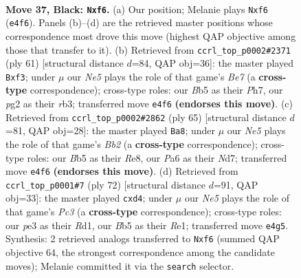 \documentclass[11pt]{article}
\begin{document}
\clearpage

\begin{figure}[p]\centering
\begin{subfigure}{0.46\textwidth}\centering
\resizebox{\linewidth}{!}{%
\newchessgame
\chessboard[
  setfen={r3r3/1kP5/p4B2/1b1N1p2/4n2R/1B2P3/1P4P1/R2KN3 b - - 0 37},
  showmover=false,
  pgfstyle=straightmove, color=movearrow, markmove={e4-f6}
]}
\caption{}
\end{subfigure}\hfill
\begin{subfigure}{0.46\textwidth}\centering
\resizebox{\linewidth}{!}{%
\newchessgame
\chessboard[
  setfen={2r2rk1/6pp/8/p4nR1/P7/1R2BN1P/4bPP1/6K1 b - - 0 31},
  showmover=false,
  pgfstyle=straightmove, color=movearrow, markmove={e2-f3}
]}
\caption{}
\end{subfigure}
\\[4pt]
\begin{subfigure}{0.46\textwidth}\centering
\resizebox{\linewidth}{!}{%
\newchessgame
\chessboard[
  setfen={3rr3/1b1n1pk1/p5p1/6P1/1R6/1NN1bP2/1PP1B3/1K1R4 b - - 2 33},
  showmover=false,
  pgfstyle=straightmove, color=movearrow, markmove={b7-a8}
]}
\caption{}
\end{subfigure}\hfill
\begin{subfigure}{0.46\textwidth}\centering
\resizebox{\linewidth}{!}{%
\newchessgame
\chessboard[
  setfen={4r1k1/3r1p2/1n4b1/8/2pbPBp1/P1P5/1P1N2K1/3RR3 w - - 0 37},
  showmover=false,
  pgfstyle=straightmove, color=movearrow, markmove={c3-d4}
]}
\caption{}
\end{subfigure}
\caption{\textbf{Move 37, Black: \texttt{Nxf6}.} (a) Our position; Melanie plays \texttt{Nxf6} (\texttt{e4f6}). Panels (b)--(d) are the retrieved master positions whose correspondence most drove this move (highest QAP objective among those that transfer to it). (b) Retrieved from \texttt{ccrl\_top\_p0002\#2371} (ply 61) [structural distance $d$=84, QAP obj=36]: the master played \texttt{Bxf3}; under $\mu$ our \emph{Ne5} plays the role of that game's \emph{Be7} (a \textbf{cross-type} correspondence); cross-type roles: our \emph{B}b5 as their \emph{P}h7, our \emph{p}g2 as their \emph{r}b3; transferred move \texttt{e4f6} \textbf{(endorses this move)}. (c) Retrieved from \texttt{ccrl\_top\_p0002\#2862} (ply 65) [structural distance $d$=81, QAP obj=28]: the master played \texttt{Ba8}; under $\mu$ our \emph{Ne5} plays the role of that game's \emph{Bb2} (a \textbf{cross-type} correspondence); cross-type roles: our \emph{B}b5 as their \emph{R}e8, our \emph{P}a6 as their \emph{N}d7; transferred move \texttt{e4f6} \textbf{(endorses this move)}. (d) Retrieved from \texttt{ccrl\_top\_p0001\#7} (ply 72) [structural distance $d$=91, QAP obj=33]: the master played \texttt{cxd4}; under $\mu$ our \emph{Ne5} plays the role of that game's \emph{Pc3} (a \textbf{cross-type} correspondence); cross-type roles: our \emph{p}e3 as their \emph{R}d1, our \emph{B}b5 as their \emph{R}e1; transferred move \texttt{e4g5}. Synthesis: 2 retrieved analogs transferred to \texttt{Nxf6} (summed QAP objective 64, the strongest correspondence among the candidate moves); Melanie committed it via the \texttt{search} selector.}
\label{fig:thought-m73}
\end{figure}
\end{document}
